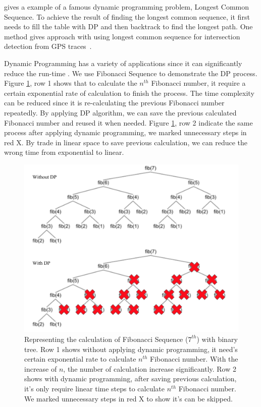  gives a example of a famous dynamic programming problem, Longest Common Sequence. To achieve the result of finding the longest common sequence, it first needs to fill the table with \ac{DP} and then backtrack to find the longest path. One method gives approach with using longest common sequence for intersection detection from GPS traces~\cite{Xie2017DetectingRI}.

Dynamic Programming has a variety of applications since it can significantly reduce the run-time \cite{bertsekas1995neuro}. 
We use Fibonacci Sequence to demonstrate the \ac{DP} process\cite{horadam1961generalized}. 
Figure \ref{fig:fbs}, row 1 shows that to calculate the $n^{th}$ Fibonacci number, it require a certain exponential rate of calculation to finish the process.
The time complexity can be reduced since it is re-calculating the previous Fibonacci number repeatedly. 
By applying \ac{DP} algorithm, we can save the previous calculated Fibonacci number and reused it when needed.
Figure \ref{fig:fbs}, row 2 indicate the same process after applying dynamic programming, we marked unnecessary steps in red X. 
By trade in linear space to save previous calculation, we can reduce the wrong time from exponential to linear.

\begin{figure}[H]
    \centering
    \includegraphics[width=\textwidth]{Figures/treewithdp.png}
    \caption[Demonstration on Fibonacci Sequence]{Representing the calculation of Fibonacci Sequence ($7^{th}$) with binary tree. Row 1 shows without applying dynamic programming, it need's certain exponential rate to calculate $n^{th}$ Fibonacci number. With the increase of $n$, the number of calculation increase significantly. Row 2 shows with dynamic programming, after saving previous calculation, it's only require linear time steps to calculate $n^{th}$ Fibonacci number. We marked unnecessary steps in red X to show it's can be skipped. }
    \label{fig:fbs}
\end{figure}

